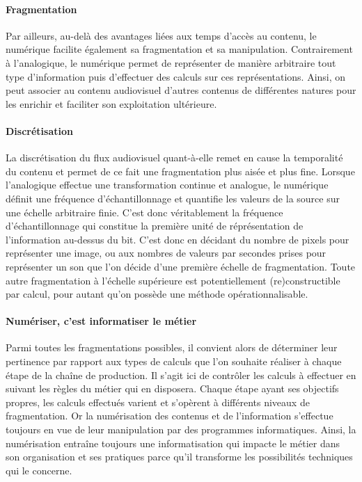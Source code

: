 \paragraph{Fragmentation}
Par ailleurs, au-delà des avantages liées aux temps d'accès au contenu, le numérique facilite également sa fragmentation et sa manipulation.
Contrairement à l'analogique, le numérique permet de représenter de manière arbitraire tout type d'information puis d'effectuer des calculs sur ces représentations. 
Ainsi, on peut associer au contenu audiovisuel d'autres contenus de différentes natures pour les enrichir et faciliter son exploitation ultérieure.

\paragraph{Discrétisation}
La discrétisation du flux audiovisuel quant-à-elle remet en cause la temporalité du contenu et permet de ce fait une fragmentation plus aisée et plus fine. 
Lorsque l'analogique effectue une transformation continue et analogue, le numérique définit une fréquence d'échantillonnage et quantifie les valeurs de la source sur une échelle arbitraire finie. 
C'est donc véritablement la fréquence d'échantillonnage qui constitue la première unité de réprésentation de l'information au-dessus du bit.
C'est donc en décidant du nombre de pixels pour représenter une image, ou aux nombres de valeurs par secondes prises pour représenter un son que l'on décide d'une première échelle de fragmentation. 
Toute autre fragmentation à l'échelle supérieure est potentiellement (re)constructible par calcul, pour autant qu'on possède une méthode opérationnalisable. 

\paragraph{Numériser, c'est informatiser le métier}
Parmi toutes les fragmentations possibles, il convient alors de déterminer leur pertinence par rapport aux types de calculs que l'on souhaite réaliser à chaque étape de la chaîne de production. 
Il s'agit ici de contrôler les calculs à effectuer en suivant les règles du métier qui en disposera.
Chaque étape ayant ses objectifs propres, les calculs effectués varient et s'opèrent à différents niveaux de fragmentation. 
Or la numérisation des contenus et de l'information s'effectue toujours en vue de leur manipulation par des programmes informatiques.
Ainsi, la numérisation entraîne toujours une informatisation qui impacte le métier dans son organisation et ses pratiques parce qu'il transforme les possibilités techniques qui le concerne.



